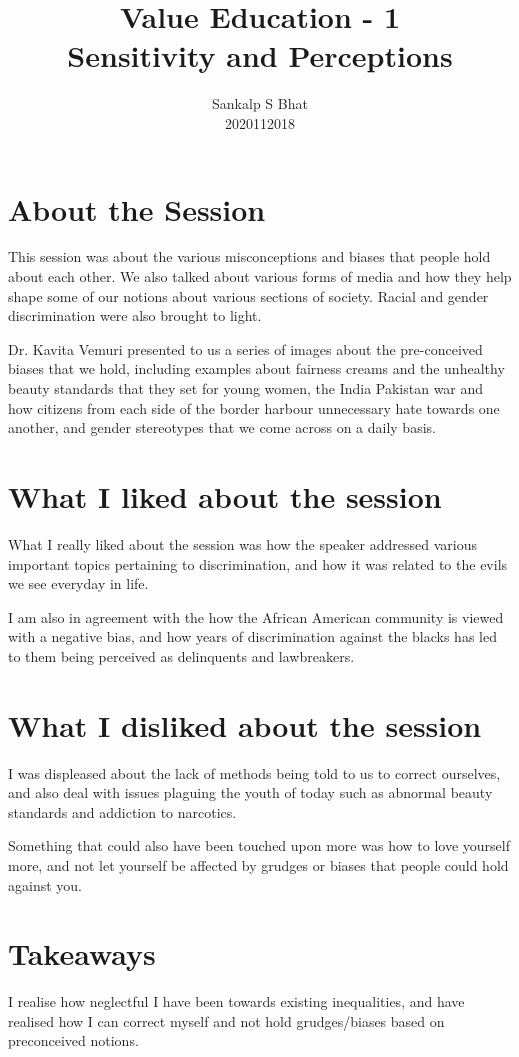 \documentclass[a4paper, 12pt]{extarticle}
\title{Value Education - 1\\
Sensitivity and Perceptions}
\author{Sankalp S Bhat\\
2020112018
}
\begin{document}
\maketitle
\thispagestyle{empty}

\section*{About the Session}
This session was about the various misconceptions and biases that people hold about each other. We also talked about various forms of media and how they help shape some of our notions about various sections of society. Racial and gender discrimination were also brought to light.

Dr. Kavita Vemuri presented to us a series of images about the pre-conceived biases that we hold, including examples about fairness creams and the unhealthy beauty standards that they set for young women, the India Pakistan war and how citizens from each side of the border harbour unnecessary hate towards one another, and gender stereotypes that we come across on a daily basis.
      
\section*{What I liked about the session}

What I really liked about the session was how the speaker addressed various important topics pertaining to discrimination, and how it was related to the evils we see everyday in life.
    
I am also in agreement with the how the African American community is viewed with a negative bias, and how years of discrimination against the blacks has led to them being perceived as delinquents and lawbreakers.
     
 \section*{What I disliked about the session}
 
I was displeased about the lack of methods being told to us to correct ourselves, and also deal with issues plaguing the youth of today such as abnormal beauty standards and addiction to narcotics.

Something that could also have been touched upon more was how to love yourself more, and not let yourself be affected by grudges or biases that people could hold against you.
 \section*{Takeaways}
    
I realise how neglectful I have been towards existing inequalities, and have realised how I can correct myself and not hold grudges/biases based on preconceived notions.
\end{document}
